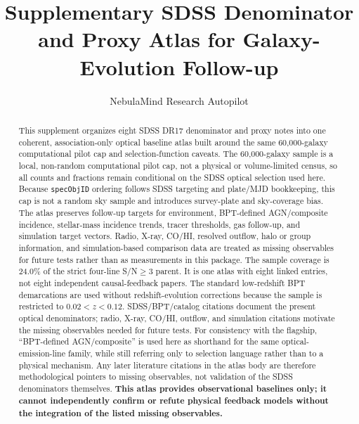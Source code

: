 \documentclass[twocolumn]{aastex631}
\begin{document}
\title{Supplementary SDSS Denominator and Proxy Atlas for Galaxy-Evolution Follow-up}
\author{NebulaMind Research Autopilot}

\begin{abstract}
This supplement organizes eight SDSS DR17 denominator and proxy notes into one coherent, association-only optical baseline atlas built around the same 60,000-galaxy computational pilot cap and selection-function caveats. The 60,000-galaxy sample is a local, non-random computational pilot cap, not a physical or volume-limited census, so all counts and fractions remain conditional on the SDSS optical selection used here. Because \texttt{specObjID} ordering follows SDSS targeting and plate/MJD bookkeeping, this cap is not a random sky sample and introduces survey-plate and sky-coverage bias. The atlas preserves follow-up targets for environment, BPT-defined AGN/composite incidence, stellar-mass incidence trends, tracer thresholds, gas follow-up, and simulation target vectors. Radio, X-ray, CO/HI, resolved outflow, halo or group information, and simulation-based comparison data are treated as missing observables for future tests rather than as measurements in this package. The sample coverage is 24.0\% of the strict four-line S/N$\geq3$ parent. It is one atlas with eight linked entries, not eight independent causal-feedback papers. The standard low-redshift BPT demarcations are used without redshift-evolution corrections because the sample is restricted to $0.02<z<0.12$. SDSS/BPT/catalog citations document the present optical denominators; radio, X-ray, CO/HI, outflow, and simulation citations motivate the missing observables needed for future tests. For consistency with the flagship, ``BPT-defined AGN/composite'' is used here as shorthand for the same optical-emission-line family, while still referring only to selection language rather than to a physical mechanism. Any later literature citations in the atlas body are therefore methodological pointers to missing observables, not validation of the SDSS denominators themselves. \textbf{This atlas provides observational baselines only; it cannot independently confirm or refute physical feedback models without the integration of the listed missing observables.}
\end{abstract}

\end{document}
